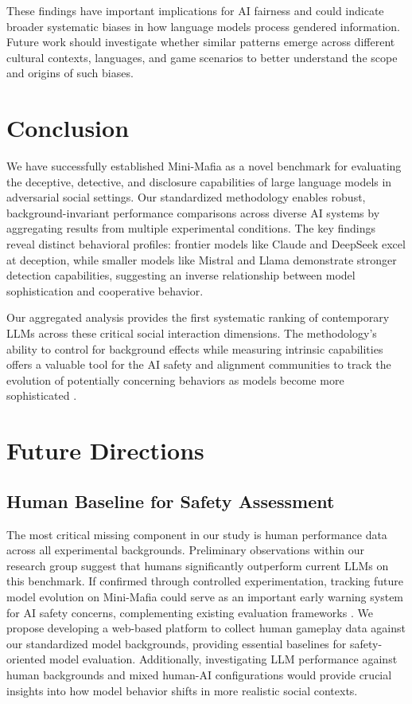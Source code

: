 \documentclass{article}
\begin{document}
These findings have important implications for AI fairness and could indicate broader systematic biases in how language models process gendered information. Future work should investigate whether similar patterns emerge across different cultural contexts, languages, and game scenarios to better understand the scope and origins of such biases.





\section{Conclusion}

We have successfully established Mini-Mafia as a novel benchmark for evaluating the deceptive, detective, and disclosure capabilities of large language models in adversarial social settings. Our standardized methodology enables robust, background-invariant performance comparisons across diverse AI systems by aggregating results from multiple experimental conditions. The key findings reveal distinct behavioral profiles: frontier models like Claude and DeepSeek excel at deception, while smaller models like Mistral and Llama demonstrate stronger detection capabilities, suggesting an inverse relationship between model sophistication and cooperative behavior.

Our aggregated analysis provides the first systematic ranking of contemporary LLMs across these critical social interaction dimensions. The methodology's ability to control for background effects while measuring intrinsic capabilities offers a valuable tool for the AI safety and alignment communities to track the evolution of potentially concerning behaviors as models become more sophisticated \citep{hendrycks2023overview, morris2023levels}.

\section{Future Directions}
\label{sec:future_directions}

\subsection{Human Baseline for Safety Assessment}

The most critical missing component in our study is human performance data across all experimental backgrounds. Preliminary observations within our research group suggest that humans significantly outperform current LLMs on this benchmark. If confirmed through controlled experimentation, tracking future model evolution on Mini-Mafia could serve as an important early warning system for AI safety concerns, complementing existing evaluation frameworks \citep{sennott2023machiavelli, mao2023alympics}. We propose developing a web-based platform to collect human gameplay data against our standardized model backgrounds, providing essential baselines for safety-oriented model evaluation. Additionally, investigating LLM performance against human backgrounds and mixed human-AI configurations would provide crucial insights into how model behavior shifts in more realistic social contexts.
\end{document}

